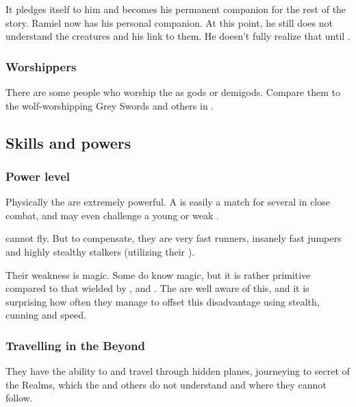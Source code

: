 It pledges itself to him and becomes his permanent companion for the rest of the story. Ramiel now has his personal \moonwolf{} companion. At this point, he still does not understand the creatures and his link to them. He doesn't fully realize that until . 





\subsubsection{Worshippers}
There are some people who worship the \moonwolves{} as gods or demigods. Compare them to the wolf-worshipping Grey Swords and others in \cite{StevenEriksonIanCameronEsslemont:MalazanBookoftheFallen}.










\subsection{Skills and powers}





\subsubsection{Power level}
Physically the \vorcanths{} are extremely powerful. 
A \vorcanth{} is easily a match for several \resphain{} in close combat, and may even challenge a young or weak \dragon{}. 

\Vorcanths{} cannot fly. 
But to compensate, they are very fast runners, insanely fast jumpers and highly stealthy stalkers (utilizing their ). 

Their weakness is magic. 
Some \vorcanths{} do know magic, but it is rather primitive compared to that wielded by \dragons{}, \resphain{} and \quiljaaran{}. 
The \vorcanths{} are well aware of this, and it is surprising how often they manage to offset this disadvantage using stealth, cunning and speed. 





\subsubsection{Travelling in the Beyond}
They have the ability to  and travel through hidden planes, journeying to secret  of the Realms, which the \dragons{} and others do not understand and where they cannot follow. 

